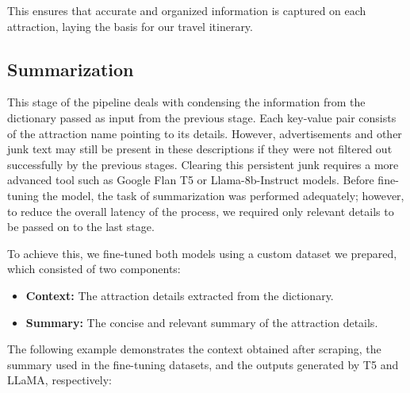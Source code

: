 \documentclass[final,3p,times,authoryear]{elsarticle}
\begin{document}
        This ensures that accurate and organized information is captured on each attraction, laying the basis for our travel itinerary.
    
    \vspace{-7pt}
    
    \subsection{Summarization}
        This stage of the pipeline deals with condensing the information from the dictionary passed as input from the previous stage. Each key-value pair consists of the attraction name pointing to its details. However, advertisements and other junk text may still be present in these descriptions if they were not filtered out successfully by the previous stages. Clearing this persistent junk requires a more advanced tool such as Google Flan T5 or Llama-8b-Instruct models. Before fine-tuning the model, the task of summarization was performed adequately; however, to reduce the overall latency of the process, we required only relevant details to be passed on to the last stage.
        
        To achieve this, we fine-tuned both models using a custom dataset we prepared, which consisted of two components:
        
        \vspace{-7pt}
        
        \begin{itemize}
          \item \textbf{Context:} The attraction details extracted from the dictionary.
          \item \textbf{Summary:} The concise and relevant summary of the attraction details.
        \end{itemize}
        
        The following example demonstrates the context obtained after scraping, the summary used in the fine-tuning datasets, and the outputs generated by T5 and LLaMA, respectively:
    
\end{document}
